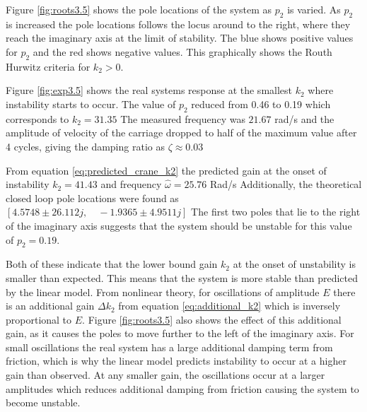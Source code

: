 \documentclass{article}
\begin{document}
Figure \ref{fig:roots3.5} shows the pole locations of the system as $p_2$ is varied. As $p_2$ is increased the pole locations follows the locus around to the right, where they reach the imaginary axis at the limit of stability.
The blue shows positive values for $p_2$ and the red shows negative values. This graphically shows the Routh Hurwitz criteria for $k_2 > 0$.

Figure \ref{fig:exp3.5} shows the real systems response at the smallest $k_2$ where instability starts to occur.
The value of $p_2$ reduced from 0.46 to 0.19 which corresponds to $k_2 = 31.35$
The measured frequency was $21.67$ rad/s and the amplitude of velocity of the carriage dropped to half of the maximum value after 4 cycles, giving the damping ratio as $\zeta \approx 0.03$

From equation \ref{eq:predicted_crane_k2} the predicted gain at the onset of instability $k_2 = 41.43$ and frequency $\hat{\omega} = 25.76$ Rad/s
Additionally, the theoretical closed loop pole locations were found as \\ 
$[ 4.5748 \pm 26.112j , \quad -1.9365 \pm 4.9511j]$
The first two poles that lie to the right of the imaginary axis suggests that the system should be unstable for this value of $p_2 = 0.19$.

Both of these indicate that the lower bound gain $k_2$ at the onset of unstability is smaller than expected. This means that the system is more stable than predicted by the linear model.
From nonlinear theory, for oscillations of amplitude $E$ there is an additional gain $\Delta k_2$ from equation \ref{eq:additional_k2} which is inversely proportional to $E$.
Figure \ref{fig:roots3.5} also shows the effect of this additional gain, as it causes the poles to move further to the left of the imaginary axis.
For small oscillations the real system has a large additional damping term from friction, which is why the linear model predicts instability to occur at a higher gain than observed.
At any smaller gain, the oscillations occur at a larger amplitudes which reduces additional damping from friction causing the system to become unstable.

\end{document}
